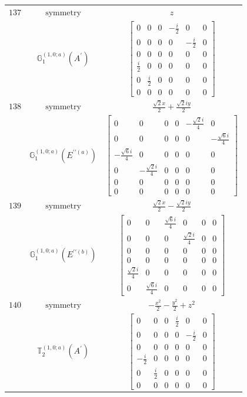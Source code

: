 \documentclass[fleqn,8pt,landscape]{jsarticle}
\begin{document}
\begin{longtable}{ccc}
$ 137 $ & $ \text{symmetry} $ & $ z $ \\
$  $ & $ \mathbb{G}_{1}^{(1,0;a)}(A^{\prime}) $ & $ \begin{bmatrix} 0 & 0 & 0 & - \frac{i}{2} & 0 & 0 \\ 0 & 0 & 0 & 0 & - \frac{i}{2} & 0 \\ 0 & 0 & 0 & 0 & 0 & 0 \\ \frac{i}{2} & 0 & 0 & 0 & 0 & 0 \\ 0 & \frac{i}{2} & 0 & 0 & 0 & 0 \\ 0 & 0 & 0 & 0 & 0 & 0 \end{bmatrix} $ \\ \hline
$ 138 $ & $ \text{symmetry} $ & $ \frac{\sqrt{2} x}{2} + \frac{\sqrt{2} i y}{2} $ \\
$  $ & $ \mathbb{G}_{1}^{(1,0;a)}(E^{\prime\prime(a)}) $ & $ \begin{bmatrix} 0 & 0 & 0 & 0 & - \frac{\sqrt{2} i}{4} & 0 \\ 0 & 0 & 0 & 0 & 0 & - \frac{\sqrt{6} i}{4} \\ - \frac{\sqrt{6} i}{4} & 0 & 0 & 0 & 0 & 0 \\ 0 & - \frac{\sqrt{2} i}{4} & 0 & 0 & 0 & 0 \\ 0 & 0 & 0 & 0 & 0 & 0 \\ 0 & 0 & 0 & 0 & 0 & 0 \end{bmatrix} $ \\ \hline
$ 139 $ & $ \text{symmetry} $ & $ \frac{\sqrt{2} x}{2} - \frac{\sqrt{2} i y}{2} $ \\
$  $ & $ \mathbb{G}_{1}^{(1,0;a)}(E^{\prime\prime(b)}) $ & $ \begin{bmatrix} 0 & 0 & \frac{\sqrt{6} i}{4} & 0 & 0 & 0 \\ 0 & 0 & 0 & \frac{\sqrt{2} i}{4} & 0 & 0 \\ 0 & 0 & 0 & 0 & 0 & 0 \\ 0 & 0 & 0 & 0 & 0 & 0 \\ \frac{\sqrt{2} i}{4} & 0 & 0 & 0 & 0 & 0 \\ 0 & \frac{\sqrt{6} i}{4} & 0 & 0 & 0 & 0 \end{bmatrix} $ \\ \hline
$ 140 $ & $ \text{symmetry} $ & $ - \frac{x^{2}}{2} - \frac{y^{2}}{2} + z^{2} $ \\
$  $ & $ \mathbb{T}_{2}^{(1,0;a)}(A^{\prime}) $ & $ \begin{bmatrix} 0 & 0 & 0 & \frac{i}{2} & 0 & 0 \\ 0 & 0 & 0 & 0 & - \frac{i}{2} & 0 \\ 0 & 0 & 0 & 0 & 0 & 0 \\ - \frac{i}{2} & 0 & 0 & 0 & 0 & 0 \\ 0 & \frac{i}{2} & 0 & 0 & 0 & 0 \\ 0 & 0 & 0 & 0 & 0 & 0 \end{bmatrix} $ \\ \hline

\end{longtable}
\end{document}
